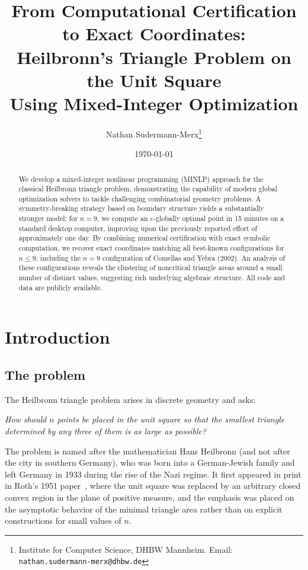 \documentclass[11pt,a4paper]{article}
\title{From Computational Certification to Exact Coordinates:\\
Heilbronn's Triangle Problem on the Unit Square\\
Using Mixed-Integer Optimization}
\author{Nathan Sudermann-Merx\thanks{Institute for Computer Science, DHBW Mannheim. Email: \texttt{nathan.sudermann-merx@dhbw.de}}}
\date{\today}
\theoremstyle{plain}
\theoremstyle{definition}
\theoremstyle{remark}
\begin{document}
\maketitle

\begin{abstract}
  We develop a mixed-integer nonlinear programming (MINLP) approach for the classical Heilbronn triangle problem, demonstrating the capability of modern global optimization solvers to tackle 
  challenging combinatorial geometry problems. A symmetry-breaking strategy based on boundary structure yields a substantially stronger model: for $n=9$, we compute an $\varepsilon$-globally optimal 
  point in 15 minutes on a standard desktop computer, improving upon the previously reported effort of approximately one day. By combining numerical certification with exact symbolic computation, 
  we recover exact coordinates matching all best-known configurations for $n\le 9$, including the $n=9$ configuration of Comellas and Yebra (2002). 
  An analysis of these configurations reveals the clustering of noncritical triangle areas around a small number of distinct values, suggesting rich underlying algebraic structure. 
  All code and data are publicly available.
  \end{abstract}
    
\section{Introduction}

\subsection{The problem}

The Heilbronn triangle problem arises in discrete geometry and asks:

\begin{mdframed}
  \centering
  \emph{How should $n$ points be placed in the unit square so that the smallest triangle determined by any three of them is as large as possible?}
  \end{mdframed}

  The problem is named after the mathematician Hans Heilbronn (and not after the city in southern Germany), who was born into a German-Jewish family and left Germany in 1933 during the rise of the Nazi regime. It first appeared in print in Roth's 1951 paper~\cite{Roth1951}, where the unit square was replaced by an arbitrary closed convex region in the plane of positive measure, and the emphasis was placed on the asymptotic behavior of the minimal triangle area rather than on explicit constructions for small values of $n$.
\end{document}
